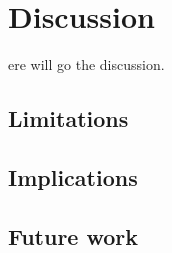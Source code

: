 %
%
\let\textcircled=\pgftextcircled
\chapter{Discussion}
\label{chap:dis}
ere will go the discussion.
\section{Limitations}
\section{Implications}
\section{Future work}